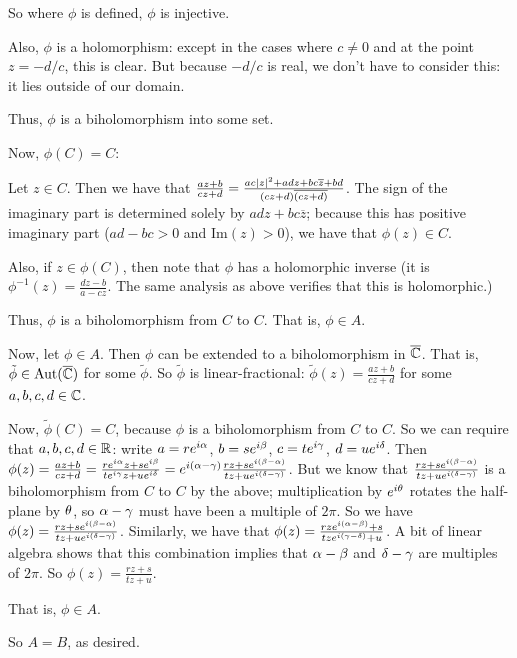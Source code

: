 \documentclass[a4paper,12pt]{article}
\begin{document}
So where $\phi$ is defined, $\phi$ is injective.

Also, $\phi$ is a holomorphism: except in the cases where $c \neq 0$ and at the point $z = -d/c$, this is clear. But because $-d/c$ is real, we don't have to consider this: it lies outside of our domain.

Thus, $\phi$ is a biholomorphism into some set.

Now, $\phi(C) = C$:

Let $z \in C$. Then we have that $\frac{az+b}{cz+d} = \frac{ac\left\lvert z \right\rvert^2 +adz+bc\overline{z} + bd}{(cz+d)\overline{(cz+d)}}$. The sign of the imaginary part is determined solely by $adz+bc\overline{z}$; because this has positive imaginary part ($ad-bc >0$ and $\text{Im}(z) >0$), we have that $\phi(z) \in C$. 

Also, if $z \in \phi(C)$, then note that $\phi$ has a holomorphic inverse (it is $\phi^{-1}(z) = \frac{dz-b}{a-cz}$. The same analysis as above verifies that this is holomorphic.) %

Thus, $\phi$ is a biholomorphism from $C$ to $C$. That is, $\phi \in A$. 

Now, let $\phi \in A$. Then $\phi$ can be extended to a biholomorphism in $\overline{\mathbb{C}}$. That is, $\tilde{\phi} \in \text{Aut}(\overline{\mathbb{C}})$ for some $\tilde{\phi}$. So $\tilde{\phi}$ is linear-fractional: $\tilde{\phi}(z) = \frac{az+b}{cz+d}$ for some $a,b,c,d \in \mathbb{C}$.

Now, $\tilde{\phi}(C) = C$, because $\phi$ is a biholomorphism from $C$ to $C$. So we can require that $a,b,c,d \in \mathbb{R}$: write $a=re^{i\alpha}$, $b=se^{i\beta}$, $c=te^{i\gamma}$, $d=ue^{i\delta}$. Then $\phi(z) = \frac{az+b}{cz+d} = \frac{re^{i\alpha}z+se^{i\beta}}{te^{i\gamma}z+ue^{i\delta}} = e^{i(\alpha-\gamma)}\frac{rz+se^{i(\beta-\alpha)}}{tz+ue^{i(\delta-\gamma)}}$. But we know that $\frac{rz+se^{i(\beta-\alpha)}}{tz+ue^{i(\delta-\gamma)}}$ is a biholomorphism from $C$ to $C$ by the above; multiplication by $e^{i\theta}$ rotates the half-plane by $\theta$, so $\alpha-\gamma$ must have been a multiple of $2\pi$. So we have $\phi(z) = \frac{rz+se^{i(\beta-\alpha)}}{tz+ue^{i(\delta-\gamma)}}$. Similarly, we have that $\phi(z) = \frac{rze^{i(\alpha-\beta)}+s}{tze^{i(\gamma-\delta)}+u}$. A bit of linear algebra shows that this combination implies that $\alpha -\beta$ and $\delta-\gamma$ are multiples of $2\pi$. So $\phi(z) = \frac{rz+s}{tz+u}$.

That is, $\phi \in A$.

So $A=B$, as desired.

\shunt
\end{document}
